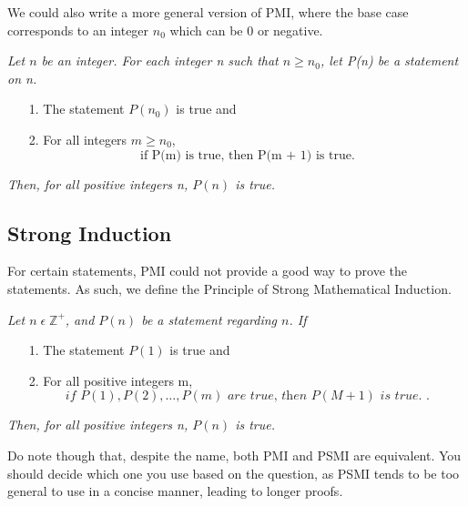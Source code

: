 \documentclass[a4paper]{article}
\begin{document}
We could also write a more general version of PMI, where the base case corresponds to an integer $n_0$ which can be 0 or negative.

\begin{tcolorbox}[title=The Principle of Mathematical Induction (Modified)]
\textit{Let $n$ be an integer. For each integer n such that $n \ge  n_0$, let P(n) be a statement on n.}
	\begin{itemize}
		\item[1.] The statement $P\left( n_0 \right) $ is true and
		\item[2.] For all integers $m\ge  n_0$, \[
				\text{if P(m) is true, then P(m + 1) is true}
		.\] 	
	\end{itemize}
	\textit{Then, for all positive integers n, $P\left( n \right)$ is true.}
\end{tcolorbox}


\subsection{Strong Induction}
For certain statements, PMI could not provide a good way to prove the statements. As such, we define the Principle of Strong Mathematical Induction.

\begin{tcolorbox}[title=The Principle of Strong Mathematical Induction]
\textit{Let $n \; \epsilon \; \mathbb{Z}^{+}$, and $P\left( n \right) $ be a statement regarding $n$. If}
	\begin{itemize}
		\item[1.] The statement $P\left( 1 \right) $ is true and
		\item[2.] For all positive integers m, \[
				\textit{if $P(1), P(2),\ldots, P(m)$ are true, then $P\left( M + 1 \right) $ is true.   }
		.\] 	
	\end{itemize}
	\textit{Then, for all positive integers n, $P\left( n \right)$ is true.}
\end{tcolorbox}
Do note though that, despite the name, both PMI and PSMI are equivalent. You should decide which one you use based on the question, as PSMI tends to be too general to use in a concise manner, leading to longer proofs. 
\end{document}

